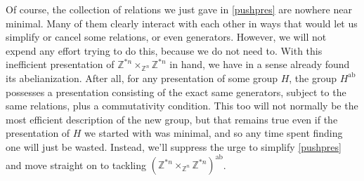 \documentclass{amsbook} %
\numberwithin{section}{chapter}
\begin{document}
Of course, the collection of relations we just gave in \cref{pushpres} are nowhere near minimal. Many of them clearly interact with each other in ways that would let us simplify or cancel some relations, or even generators. However, we will not expend any effort trying to do this, because we do not need to. With this inefficient presentation of $\mathbb{Z}^{\ast n} \times_{\mathbb{Z}^n} \mathbb{Z}^{\ast n}$ in hand, we have in a sense already found its abelianization. After all, for any presentation of some group $H$, the group $H^{\mathrm{ab}}$ possesses a presentation consisting of the exact same generators, subject to the same relations, plus a commutativity condition. This too will not normally be the most efficient description of the new group, but that remains true even if the presentation of $H$ we started with was minimal, and so any time spent finding one will just be wasted. Instead, we'll suppress the urge to simplify \cref{pushpres} and move straight on to tackling $(\mathbb{Z}^{\ast n} \times_{\mathbb{Z}^n} \mathbb{Z}^{\ast n})^{\mathrm{ab}}$.
\end{document}
